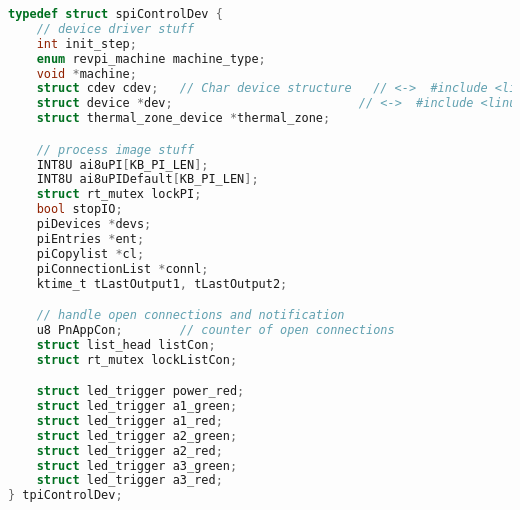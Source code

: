 \begin{lstlisting}[language={c},firstnumber=62,caption={Definition des Struct spiControlDev in piControlMain.h\label{lst:4-spiControlDev}}]
typedef struct spiControlDev {
	// device driver stuff
	int init_step;
	enum revpi_machine machine_type;
	void *machine;
	struct cdev cdev;	// Char device structure   // <->  #include <linux/cdev.h>
	struct device *dev;                          // <->  #include <linux/device.h>
	struct thermal_zone_device *thermal_zone;

	// process image stuff
	INT8U ai8uPI[KB_PI_LEN];
	INT8U ai8uPIDefault[KB_PI_LEN];
	struct rt_mutex lockPI;
	bool stopIO;
	piDevices *devs;
	piEntries *ent;
	piCopylist *cl;
	piConnectionList *connl;
	ktime_t tLastOutput1, tLastOutput2;

	// handle open connections and notification
	u8 PnAppCon;		// counter of open connections
	struct list_head listCon;
	struct rt_mutex lockListCon;

	struct led_trigger power_red;
	struct led_trigger a1_green;
	struct led_trigger a1_red;
	struct led_trigger a2_green;
	struct led_trigger a2_red;
	struct led_trigger a3_green;
	struct led_trigger a3_red;
} tpiControlDev;
\end{lstlisting}

